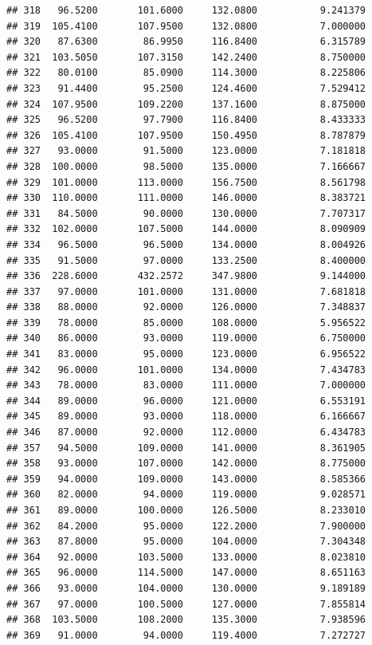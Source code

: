 \documentclass[]{article}
\begin{document}
\begin{verbatim}
## 318   96.5200       101.6000     132.0800           9.241379
## 319  105.4100       107.9500     132.0800           7.000000
## 320   87.6300        86.9950     116.8400           6.315789
## 321  103.5050       107.3150     142.2400           8.750000
## 322   80.0100        85.0900     114.3000           8.225806
## 323   91.4400        95.2500     124.4600           7.529412
## 324  107.9500       109.2200     137.1600           8.875000
## 325   96.5200        97.7900     116.8400           8.433333
## 326  105.4100       107.9500     150.4950           8.787879
## 327   93.0000        91.5000     123.0000           7.181818
## 328  100.0000        98.5000     135.0000           7.166667
## 329  101.0000       113.0000     156.7500           8.561798
## 330  110.0000       111.0000     146.0000           8.383721
## 331   84.5000        90.0000     130.0000           7.707317
## 332  102.0000       107.5000     144.0000           8.090909
## 334   96.5000        96.5000     134.0000           8.004926
## 335   91.5000        97.0000     133.2500           8.400000
## 336  228.6000       432.2572     347.9800           9.144000
## 337   97.0000       101.0000     131.0000           7.681818
## 338   88.0000        92.0000     126.0000           7.348837
## 339   78.0000        85.0000     108.0000           5.956522
## 340   86.0000        93.0000     119.0000           6.750000
## 341   83.0000        95.0000     123.0000           6.956522
## 342   96.0000       101.0000     134.0000           7.434783
## 343   78.0000        83.0000     111.0000           7.000000
## 344   89.0000        96.0000     121.0000           6.553191
## 345   89.0000        93.0000     118.0000           6.166667
## 346   87.0000        92.0000     112.0000           6.434783
## 357   94.5000       109.0000     141.0000           8.361905
## 358   93.0000       107.0000     142.0000           8.775000
## 359   94.0000       109.0000     143.0000           8.585366
## 360   82.0000        94.0000     119.0000           9.028571
## 361   89.0000       100.0000     126.5000           8.233010
## 362   84.2000        95.0000     122.2000           7.900000
## 363   87.8000        95.0000     104.0000           7.304348
## 364   92.0000       103.5000     133.0000           8.023810
## 365   96.0000       114.5000     147.0000           8.651163
## 366   93.0000       104.0000     130.0000           9.189189
## 367   97.0000       100.5000     127.0000           7.855814
## 368  103.5000       108.2000     135.3000           7.938596
## 369   91.0000        94.0000     119.4000           7.272727

\end{verbatim}
\end{document}
